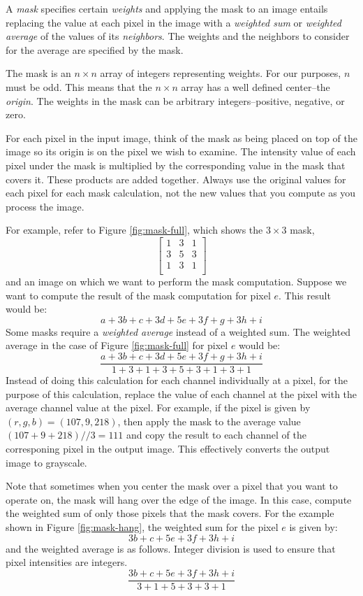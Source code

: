 \documentclass[addpoints]{exam}
\begin{document}
A \textit{mask} specifies certain \textit{weights} and applying the mask to an image entails replacing the value at each pixel in the image with a \textit{weighted sum} or \textit{weighted average} of the values of its \textit{neighbors}. The weights and the neighbors to consider for the average are specified by the mask.

The  mask is an $n \times n$ array of integers representing weights. For our purposes, $n$ must be odd. This means that the $n \times n$ array has a well defined center--the \textit{origin}. The weights in the mask can be arbitrary integers--positive, negative, or zero.

For each pixel in the input image, think of the mask as being placed on top of the image so its origin is on the pixel we wish to examine. The intensity value of each pixel under the mask is multiplied by the corresponding value in the mask that covers it. These products are added together. Always use the original values for each pixel for each mask calculation, not the new values that you compute as you process the image.

For example, refer to Figure \ref{fig:mask-full}, which shows the  $3 \times 3$ mask,
\[
  \left[
    \begin{array}{ccc}
      1 & 3 & 1\\
      3 & 5 & 3\\
      1 & 3 & 1\\
    \end{array}          
  \right]
\]
and an image on which we want to perform the mask computation. Suppose we want to compute the result of the mask computation for pixel $e$. This result would be:
\[
  a + 3b + c + 3d + 5e + 3f + g + 3h + i
\]
Some masks require a \textit{weighted average} instead of a weighted sum. The weighted average in the case of Figure \ref{fig:mask-full} for pixel $e$ would be:
\[
  \frac{a + 3b + c + 3d + 5e + 3f + g + 3h + i} {1 + 3 + 1 + 3 + 5 + 3 + 1 + 3 + 1}
\]
Instead of doing this calculation for each channel individually at a pixel, for the purpose of this calculation, replace the value of each channel at the pixel with the average channel value at the pixel. For example, if the pixel is given by $(r, g, b) = (107, 9, 218)$, then apply the mask to the average value $(107 + 9 + 218)//3 = 111$ and copy the result to each channel of the corresponing pixel in the output image. This effectively converts the output image to grayscale.

Note that sometimes when you center the mask over a pixel that you want to operate on, the mask will hang over the edge of the image. In this case, compute the weighted sum of only those pixels that the mask covers. For the example shown in Figure \ref{fig:mask-hang}, the weighted sum for the pixel $e$ is given by:
\[
  3b + c + 5e + 3f + 3h + i
\]
and the weighted average is as follows. Integer division is used to ensure that pixel intensities are integers.
\[
  \frac{3b + c + 5e + 3f + 3h + i}{3+1+5+3+3+1}
\]
\end{document}
